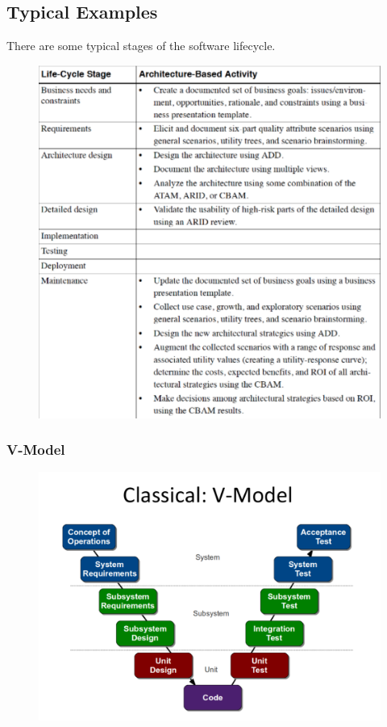 \documentclass[a4paper]{article}
\begin{document}
\subsection{Typical Examples}
There are some typical stages of the software lifecycle.
\begin{figure}[H]
\begin{center} 
    \includegraphics[scale=0.7]{images/LifecycleStages.pdf}
\end{center}
\end{figure}

\subsubsection{V-Model}
\begin{figure}[H]
\begin{center} 
    \includegraphics[scale=0.3]{images/VModel.pdf}
\end{center}
\end{figure}
\end{document}
